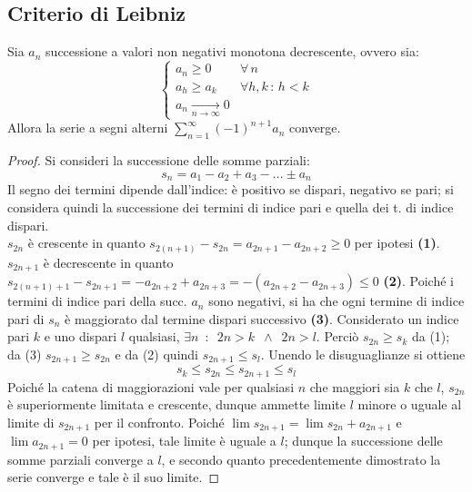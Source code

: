 \documentclass[10pt, oneside]{book}
\theoremstyle{plain}
\begin{document}
\subsection{Criterio di Leibniz}
\hypertarget{leibniz}{
\begin{ther}
Sia $a_n$ successione a valori non negativi monotona decrescente, ovvero sia:
\begin{equation*}
    \begin{cases}
    a_n \geq 0 & \forall \, n\\
    a_{h} \geq a_{k} & \forall h, k \, : \, h < k\\
    a_n \xrightarrow[n \rightarrow \infty]{} 0
    \end{cases}
\end{equation*}
Allora la serie a segni alterni $\displaystyle \sum_{n=1}^{\infty} (-1)^{n+1} a_n$ converge.
\end{ther}
}
\begin{proof}
Si consideri la successione delle somme parziali:
\[s_n = a_1 - a_2 + a_3 - ... \pm a_n\]
Il segno dei termini dipende dall'indice: è positivo se dispari, negativo se pari; si considera quindi la successione dei termini di indice pari e quella dei t. di indice dispari.
\\$s_{2n}$ è crescente in quanto $s_{2(n+1)} - s_{2n} = a_{2n+1} - a_{2n+2} \geq 0$ per ipotesi \textbf{(1)}.
\\$s_{2n+1}$ è decrescente in quanto $s_{2(n+1)+1} - s_{2n+1} = - a_{2n+2} + a_{2n+3} = - (a_{2n+2} - a_{2n+3}) \leq 0$ \textbf{(2)}. Poiché i termini di indice pari della succ. $a_n$ sono negativi, si ha che ogni termine di indice pari di $s_n$ è maggiorato dal termine dispari successivo \textbf{(3)}. Considerato un indice pari $k$ e uno dispari $l$ qualsiasi, $\exists n \enspace : \enspace 2n > k \enspace \land \enspace 2n > l$. Perciò $s_{2n} \geq s_k$ da (1); da (3) $s_{2n+1} \geq s_{2n}$ e da (2) quindi $s_{2n+1} \leq s_l$. Unendo le disuguaglianze si ottiene
\[s_k \leq s_{2n} \leq s_{2n+1} \leq s_l\]
Poiché la catena di maggiorazioni vale per qualsiasi $n$ che maggiori sia $k$ che $l$, $s_{2n}$ è superiormente limitata e crescente, dunque ammette limite $l$ minore o uguale al limite di $s_{2n+1}$ per il confronto. Poiché $\lim s_{2n+1} = \lim s_{2n} + a_{2n+1}$ e $\lim a_{2n+1} = 0$ per ipotesi, tale limite è uguale a $l$; dunque la successione delle somme parziali converge a $l$, e secondo quanto precedentemente dimostrato la serie converge e tale è il suo limite.
\end{proof}
\end{document}
